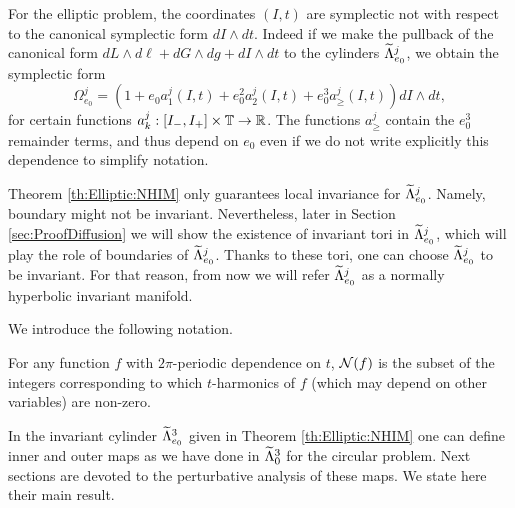 For the elliptic problem, the coordinates $(I,t)$ are symplectic not with respect to the canonical symplectic form $dI\wedge dt$. Indeed if we make the pullback of the canonical form $dL\wedge d\ell+dG\wedge dg+dI\wedge dt$ to the cylinders $\widetilde\Lambda_{e_0}^j$, we obtain the symplectic form
\begin{equation}\label{def:InnerDiffForm:Ell}
 \Omega^j_{e_0}=\left(1+e_0 a^j_1(I,t)+e_0^2a^j_2 (I,t)+e_0^3 a^j_\geq(I,t)\right)dI\wedge dt,
\end{equation}
for certain functions $a_k^j:[I_-,I_+]\times\mathbb{T}\rightarrow \mathbb{R}$. The functions $a^j_\geq$ contain the $e_0^3$ remainder terms, and thus depend on $e_0$ even if we do not write explicitly this dependence to simplify notation.

\begin{remark}
  Theorem \ref{th:Elliptic:NHIM} only guarantees local invariance for $\widetilde\Lambda^j_{e_0}$. 
  Namely, boundary might not be invariant.  
  Nevertheless, later in Section \ref{sec:ProofDiffusion} we will show the existence of invariant tori
  in $\widetilde\Lambda^j_{e_0}$, which will play the role of boundaries of $\widetilde\Lambda^j_{e_0}$. Thanks to these
  tori, one can choose $\widetilde\Lambda^j_{e_0}$ to be invariant. For that reason, from now we will refer
  $\widetilde\Lambda^j_{e_0}$ as a normally hyperbolic invariant manifold.
\end{remark}


We introduce the following notation.
\begin{notation}
  For any function $f$ with $2\pi$-periodic dependence on $t$, $\mathcal{N}(f)$ is the subset
  of the integers corresponding to which $t$-harmonics of $f$ (which may depend on other variables)  are non-zero.
\end{notation}


In the invariant cylinder $\widetilde\Lambda_{e_0}^3$ given 
in Theorem \ref{th:Elliptic:NHIM} one can define inner and outer
maps as we have done in $\widetilde\Lambda_0^3$ for the circular problem. 
Next sections are devoted to the perturbative analysis of these maps. 
We state here their main result.

